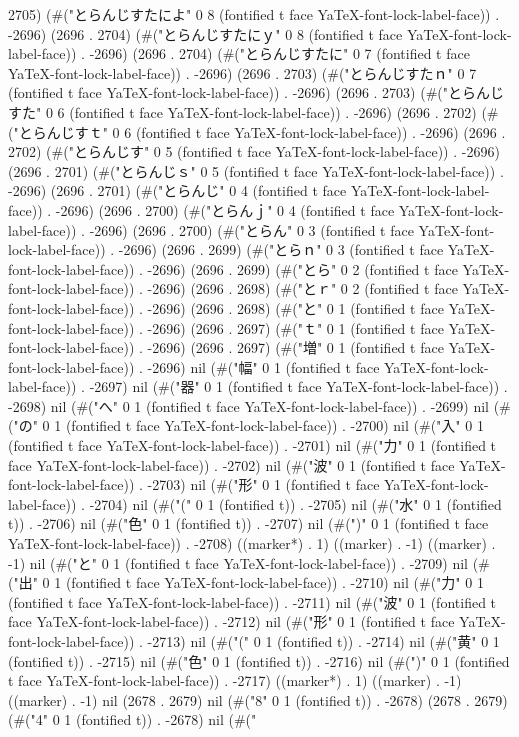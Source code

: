 2705) (#("とらんじすたによ" 0 8 (fontified t face YaTeX-font-lock-label-face)) . -2696) (2696 . 2704) (#("とらんじすたにｙ" 0 8 (fontified t face YaTeX-font-lock-label-face)) . -2696) (2696 . 2704) (#("とらんじすたに" 0 7 (fontified t face YaTeX-font-lock-label-face)) . -2696) (2696 . 2703) (#("とらんじすたｎ" 0 7 (fontified t face YaTeX-font-lock-label-face)) . -2696) (2696 . 2703) (#("とらんじすた" 0 6 (fontified t face YaTeX-font-lock-label-face)) . -2696) (2696 . 2702) (#("とらんじすｔ" 0 6 (fontified t face YaTeX-font-lock-label-face)) . -2696) (2696 . 2702) (#("とらんじす" 0 5 (fontified t face YaTeX-font-lock-label-face)) . -2696) (2696 . 2701) (#("とらんじｓ" 0 5 (fontified t face YaTeX-font-lock-label-face)) . -2696) (2696 . 2701) (#("とらんじ" 0 4 (fontified t face YaTeX-font-lock-label-face)) . -2696) (2696 . 2700) (#("とらんｊ" 0 4 (fontified t face YaTeX-font-lock-label-face)) . -2696) (2696 . 2700) (#("とらん" 0 3 (fontified t face YaTeX-font-lock-label-face)) . -2696) (2696 . 2699) (#("とらｎ" 0 3 (fontified t face YaTeX-font-lock-label-face)) . -2696) (2696 . 2699) (#("とら" 0 2 (fontified t face YaTeX-font-lock-label-face)) . -2696) (2696 . 2698) (#("とｒ" 0 2 (fontified t face YaTeX-font-lock-label-face)) . -2696) (2696 . 2698) (#("と" 0 1 (fontified t face YaTeX-font-lock-label-face)) . -2696) (2696 . 2697) (#("ｔ" 0 1 (fontified t face YaTeX-font-lock-label-face)) . -2696) (2696 . 2697) (#("増" 0 1 (fontified t face YaTeX-font-lock-label-face)) . -2696) nil (#("幅" 0 1 (fontified t face YaTeX-font-lock-label-face)) . -2697) nil (#("器" 0 1 (fontified t face YaTeX-font-lock-label-face)) . -2698) nil (#("へ" 0 1 (fontified t face YaTeX-font-lock-label-face)) . -2699) nil (#("の" 0 1 (fontified t face YaTeX-font-lock-label-face)) . -2700) nil (#("入" 0 1 (fontified t face YaTeX-font-lock-label-face)) . -2701) nil (#("力" 0 1 (fontified t face YaTeX-font-lock-label-face)) . -2702) nil (#("波" 0 1 (fontified t face YaTeX-font-lock-label-face)) . -2703) nil (#("形" 0 1 (fontified t face YaTeX-font-lock-label-face)) . -2704) nil (#("(" 0 1 (fontified t)) . -2705) nil (#("水" 0 1 (fontified t)) . -2706) nil (#("色" 0 1 (fontified t)) . -2707) nil (#(")" 0 1 (fontified t face YaTeX-font-lock-label-face)) . -2708) ((marker*) . 1) ((marker) . -1) ((marker) . -1) nil (#("と" 0 1 (fontified t face YaTeX-font-lock-label-face)) . -2709) nil (#("出" 0 1 (fontified t face YaTeX-font-lock-label-face)) . -2710) nil (#("力" 0 1 (fontified t face YaTeX-font-lock-label-face)) . -2711) nil (#("波" 0 1 (fontified t face YaTeX-font-lock-label-face)) . -2712) nil (#("形" 0 1 (fontified t face YaTeX-font-lock-label-face)) . -2713) nil (#("(" 0 1 (fontified t)) . -2714) nil (#("黄" 0 1 (fontified t)) . -2715) nil (#("色" 0 1 (fontified t)) . -2716) nil (#(")" 0 1 (fontified t face YaTeX-font-lock-label-face)) . -2717) ((marker*) . 1) ((marker) . -1) ((marker) . -1) nil (2678 . 2679) nil (#("8" 0 1 (fontified t)) . -2678) (2678 . 2679) (#("4" 0 1 (fontified t)) . -2678) nil (#("
